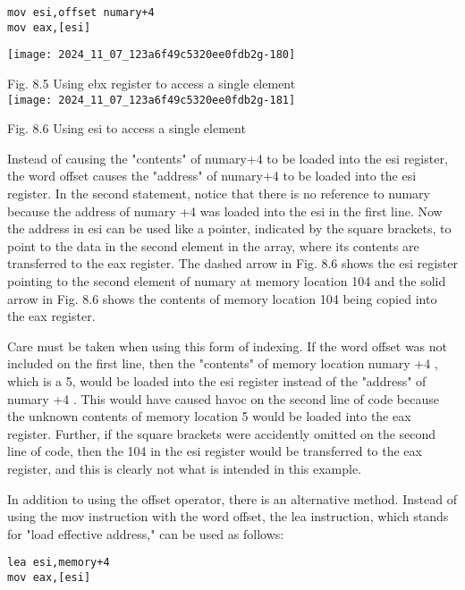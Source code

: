 \documentclass[10pt]{article}
\begin{document}
\begin{verbatim}
mov esi,offset numary+4
mov eax,[esi]
\end{verbatim}

\begin{center}
\texttt{[image: 2024\_11\_07\_123a6f49c5320ee0fdb2g-180]}
\end{center}

Fig. 8.5 Using ebx register to access a single element\\
\texttt{[image: 2024\_11\_07\_123a6f49c5320ee0fdb2g-181]}

Fig. 8.6 Using esi to access a single element

Instead of causing the "contents" of numary+4 to be loaded into the esi register, the word offset causes the "address" of numary+4 to be loaded into the esi register. In the second statement, notice that there is no reference to numary because the address of numary +4 was loaded into the esi in the first line. Now the address in esi can be used like a pointer, indicated by the square brackets, to point to the data in the second element in the array, where its contents are transferred to the eax register. The dashed arrow in Fig. 8.6 shows the esi register pointing to the second element of numary at memory location 104 and the solid arrow in Fig. 8.6 shows the contents of memory location 104 being copied into the eax register.

Care must be taken when using this form of indexing. If the word offset was not included on the first line, then the "contents" of memory location numary +4 , which is a 5, would be loaded into the esi register instead of the "address" of numary +4 . This would have caused havoc on the second line of code because the unknown contents of memory location 5 would be loaded into the eax register. Further, if the square brackets were accidently omitted on the second line of code, then the 104 in the esi register would be transferred to the eax register, and this is clearly not what is intended in this example.

In addition to using the offset operator, there is an alternative method. Instead of using the mov instruction with the word offset, the lea instruction, which stands for "load effective address," can be used as follows:

\begin{verbatim}
lea esi,memory+4
mov eax,[esi]
\end{verbatim}
\end{document}
